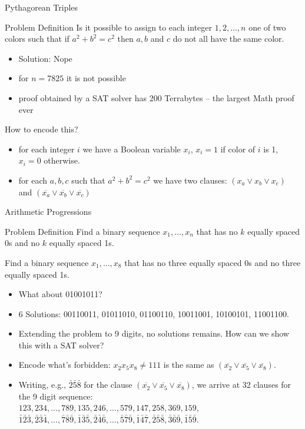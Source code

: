 \documentclass[t]{sdqbeamer}
\begin{document}
\begin{frame}{Pythagorean Triples}
\begin{block}{Problem Definition}
Is it possible to assign to each integer $1,2,\ldots,n$ one of two colors such that if
$a^2+b^2=c^2$ then $a,b$ and $c$ do not all have the same color.
\end{block}
\begin{itemize}
	\item Solution: Nope
	\item for $n=7825$ it is not possible
	\item proof obtained by a SAT solver has 200 Terrabytes -- the largest Math proof ever
\end{itemize}
\pause
\begin{block}{How to encode this?}
\begin{itemize}
	\item for each integer $i$ we have a Boolean variable $x_i$, $x_i=1$ if color of $i$ is 1, $x_i=0$ otherwise.
	\item for each $a,b,c$ such that $a^2+b^2=c^2$ we have two clauses: $(x_a \vee x_b \vee x_c)$
	and $(\overline{x_a} \vee \overline{x_b} \vee \overline{x_c})$
\end{itemize}
\end{block}
\end{frame}


\begin{frame}{Arithmetic Progressions}
\begin{block}{Problem Definition}
	Find a binary sequence $x_1, \dots, x_n$ that has no $k$ equally spaced 0s and no $k$ equally spaced 1s.
\end{block}
\pause
\begin{example}[$n=8, k=3$]
Find a binary sequence $x_1,\dots,x_8$ that has no three equally spaced 0s and no three equally spaced 1s.
\begin{itemize}
\item<2-> What about 01001011? 
\item<4-> 6 Solutions: 00110011, 01011010, 01100110, 10011001, 10100101, 11001100.
\item<5-> Extending the problem to 9 digits, no solutions remains. How can we show this with a SAT solver?
\item<6-> Encode what's forbidden: $x_2 x_5 x_8 \neq 111$ is the same as
   $(\overline{x_2} \lor \overline{x_5} \lor \overline{x_8})$.
\item<7-> Writing, e.g., $\bar 2 \bar 5 \bar 8$ for the clause $(\overline{x_2} \lor \overline{x_5} \lor \overline{x_8})$, we arrive
  at 32 clauses for the 9 digit sequence: \\
  $123, 234, \dots, 789, 135, 246, \dots, 579, 147, 258, 369, 159$,
  $\bar 1 \bar 2 \bar 3, \bar 2 \bar 3 \bar 4, \dots, \bar 7 \bar 8 \bar 9, \bar 1 \bar 3 \bar 5, \bar 2 \bar 4 \bar 6, 
  \dots, \bar 5 \bar 7 \bar 9, \bar 1 \bar 4 \bar 7, \bar 2 \bar 5 \bar 8, \bar 3 \bar 6 \bar 9, \bar 1 \bar 5 \bar 9$.
\end{itemize}
\end{example}
\end{frame}
\end{document}
